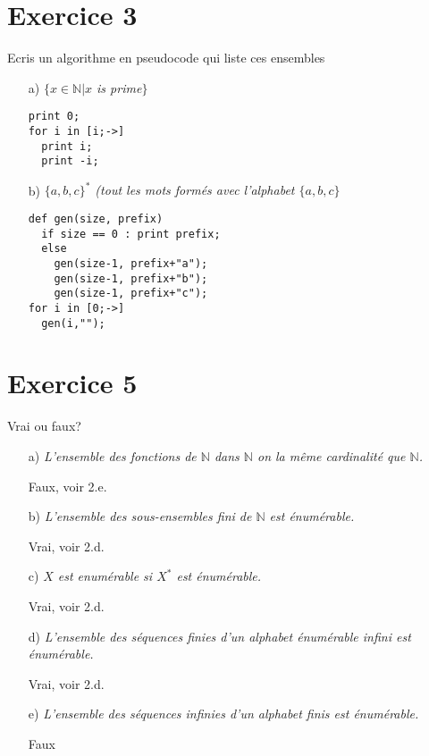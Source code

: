 \documentclass[a4paper,onecolumn,11pt]{article}
\begin{document}
\section*{Exercice 3}

Ecris un algorithme en pseudocode qui liste ces ensembles

\begin{itemize}
	\item[a)]\textit{$\{x\in\mathbb{N}|x$ is prime$\}$}
	
	\begin{lstlisting}[frame=single]
print 0;
for i in [i;->]
  print i;
  print -i;
	\end{lstlisting}	
	
	\item[b)]\textit{$\{a,b,c\}^*$ (tout les mots formés avec l'alphabet $\{a,b,c\}$}
	
	\begin{lstlisting}[frame=single]
def gen(size, prefix)
  if size == 0 : print prefix;
  else
    gen(size-1, prefix+"a");
    gen(size-1, prefix+"b");
    gen(size-1, prefix+"c");
for i in [0;->]
  gen(i,"");
	\end{lstlisting}	
\end{itemize}

\section*{Exercice 5}
Vrai ou faux?
\begin{itemize}
	\item[a)]\textit{L'ensemble des fonctions de $\mathbb{N}$ dans $\mathbb{N}$ on la même cardinalité que $\mathbb{N}$.}

	Faux, voir 2.e.	
	
	\item[b)]\textit{L'ensemble des sous-ensembles fini de $\mathbb{N}$ est énumérable.}

	Vrai, voir 2.d.		
	
	\item[c)]\textit{$X$ est enumérable si $X^*$ est énumérable.}
	
	Vrai, voir 2.d.		
	
	\item[d)]\textit{L'ensemble des séquences finies d'un alphabet énumérable infini est énumérable.}

	Vrai, voir 2.d.		
		
	\item[e)]\textit{L'ensemble des séquences infinies d'un alphabet finis est énumérable.}
	
	Faux
\end{itemize}
\end{document}
